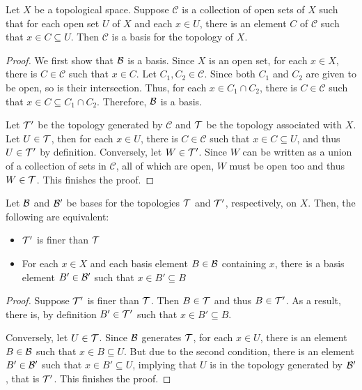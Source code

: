 \begin{lemma}
    Let $X$ be a topological space. Suppose $\mathcal{C}$ is a collection of open sets of $X$ such that for each open set $U$ of $X$ and each $x\in U$, there is an element $C$ of $\mathcal{C}$ such that $x\in C\subseteq U$. Then $\mathcal{C}$ is a basis for the topology of $X$.
\end{lemma}
\begin{proof}
    We first show that $\mathcal{B}$ is a basis. Since $X$ is an open set, for each $x\in X$, there is $C\in\mathcal{C}$ such that $x\in C$. Let $C_1,C_2\in\mathcal{C}$. Since both $C_1$ and $C_2$ are given to be open, so is their intersection. Thus, for each $x\in C_1\cap C_2$, there is $C\in\mathcal{C}$ such that $x\in C\subseteq C_1\cap C_2$. Therefore, $\mathcal{B}$ is a basis.

    Let $\mathcal{T}'$ be the topology generated by $\mathcal{C}$ and $\mathcal{T}$ be the topology associated with $X$. Let $U\in\mathcal{T}$, then for each $x\in U$, there is $C\in\mathcal{C}$ such that $x\in C\subseteq U$, and thus $U\in\mathcal{T}'$ by definition. Conversely, let $W\in\mathcal{T}'$. Since $W$ can be written as a union of a collection of sets in $\mathcal{C}$, all of which are open, $W$ must be open too and thus $W\in\mathcal{T}$. This finishes the proof.
\end{proof}

\begin{lemma}
    Let $\mathcal{B}$ and $\mathcal{B}'$ be bases for the topologies $\mathcal{T}$ and $\mathcal{T}'$, respectively, on $X$. Then, the following are equivalent:
    \begin{itemize}
        \item $\mathcal{T}'$ is finer than $\mathcal{T}$
        \item For each $x\in X$ and each basis element $B\in\mathcal{B}$ containing $x$, there is a basis element $B'\in\mathcal{B}'$ such that $x\in B'\subseteq B$
    \end{itemize}
\end{lemma}
\begin{proof}
    Suppose $\mathcal{T}'$ is finer than $\mathcal{T}$. Then $B\in\mathcal{T}$ and thus $B\in\mathcal{T}'$. As a result, there is, by definition $B'\in\mathcal{T}'$ such that $x\in B'\subseteq B$.

    Conversely, let $U\in\mathcal{T}$. Since $\mathcal{B}$ generates $\mathcal{T}$, for each $x\in U$, there is an element $B\in\mathcal{B}$ such that $x\in B\subseteq U$. But due to the second condition, there is an element $B'\in\mathcal{B}'$ such that $x\in B'\subseteq U$, implying that $U$ is in the topology generated by $\mathcal{B}'$, that is $\mathcal{T}'$. This finishes the proof.
\end{proof}

